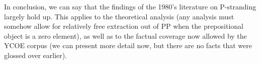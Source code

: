 \documentclass[output=paper]{langsci/langscibook}
\begin{document}
In conclusion, we can say that the findings of the 1980’s literature on
P-strand\-ing largely hold up. This applies to the theoretical analysis (any
analysis must somehow allow for relatively free extraction out of PP when the
prepositional object is a zero element), as well as to the
factual coverage now allowed by the \gls{YCOE} corpus (we can present more
detail now, but there are no facts that were glossed over earlier).



\printchapterglossary{}

{\sloppy
\printbibliography[heading=subbibliography,notkeyword=this]
}
\end{document}
